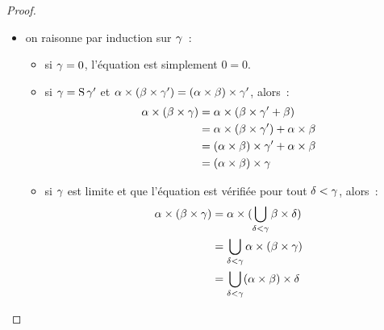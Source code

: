 \begin{proof}
\begin{itemize}
\begin{itemize}
\begin{align*}
        &= \varOa \times \varOb + \varOa \times \varOc' + \varOa\\
        &= \varOa \times \varOb + \varOa \times \varOc
      \end{align*}
    \item si $\varOc$ est limite et que l'équation est vérifiée pour tout
      $\varOd < \varOc$, alors
      \begin{align*}
        \varOa \times (\varOb + \varOd)
        &= \varOa \times (\bigcup_{\varOd < \varOc} \varOb + \varOd)\\
        &= \bigcup_{\varOd < \varOc} \varOa \times (\varOb + \varOd)\\
        &= \bigcup_{\varOd < \varOd} (\varOa\times\varOb + \varOa\times \varOd)\\
        &= \varOa \times \varOb + \bigcup_{\varOd < \varOc} \varOa \times \varOd\\
        &= \varOa \times \varOb + \varOa \times \varOc
      \end{align*}
    \end{itemize}
  \item on raisonne par induction sur $\varOc$~:
    \begin{itemize}
    \item si $\gamma = 0$, l'équation est simplement $0 = 0$.
    \item si $\gamma = \operatorname{S}\gamma'$ et
      $\alpha \times (\beta\times\gamma') = (\alpha\times\beta)\times\gamma'$,
      alors~:
      \begin{align*}
        \alpha \times (\beta \times \gamma) &=
        \alpha \times (\beta\times \gamma' + \beta) \\
        &= \alpha \times (\beta\times \gamma') +
        \alpha \times \beta\\
        &= (\alpha \times \beta) \times \gamma' + \alpha \times \beta\\
        &= (\alpha \times \beta) \times \gamma
      \end{align*}
    \item si $\varOc$ est limite et que l'équation est vérifiée pour tout
      $\varOd < \varOc$, alors~:
      \begin{align*}
        \varOa \times (\varOb \times \varOc) &= \varOa \times
        (\bigcup_{\varOd < \varOc} \varOb \times \varOd)\\
        &= \bigcup_{\varOd < \varOc} \varOa \times (\varOb \times \varOc)\\
        &= \bigcup_{\varOd < \varOc} (\varOa \times \varOb) \times \varOd\\

\end{align*}
\end{itemize}
\end{itemize}
\end{proof}
